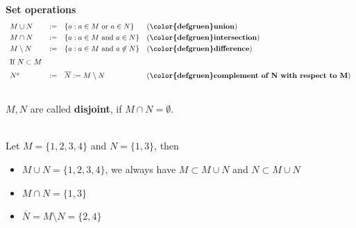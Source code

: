 \begin{frame} 
\textbf{\large Set operations} ~\\ 
\vspace{0.2cm}
$$\begin{array}{llll} 
M \cup N &:=& \lbrace a: a\in M \text{ or } a \in N\rbrace&\text{(\textbf{\color{defgruen}union})}\\[3pt]
M \cap N &:=& \lbrace a: a\in M \text{ and } a \in N\rbrace&\text{(\textbf{\color{defgruen}intersection})}\\[3pt]
M \setminus N &:=& \lbrace a : a\in M \text{ and } a \not\in N\rbrace&\text{(\textbf{\color{defgruen}difference})}\\[6pt]
\text{If}~N\subset M&&&\\[6pt]
 N^c  &:=&  \overline{N}:= M \setminus N&\text{(\textbf{\color{defgruen}complement of N with respect to M})}\\[3pt]
\end{array}$$ 
~\\\vspace{0.3cm}
$M, N$ are called \textbf{\color{defgruen}disjoint},  if $M \cap N = \emptyset$.
%
\vspace{0.5cm}
\begin{ex} \label{ex:set_operations}
	~\\
	\blank
	Let $M = \{1,2,3, 4\}$ and $N = \{1,3\}$, then\vspace{0.2cm}
	\begin{itemize}
		\blank
		\item[] $M \cup N = \{1,2,3, 4\}$, we always have $M \subset M\cup N$ and  $N \subset M\cup N$ \vspace{0.2cm}
		\item[] $M \cap N = \{1, 3\}$\vspace{0.2cm}
		\item[] $\overline{N} =M \setminus N = \{2, 4\}$
	\end{itemize}
\end{ex}
\vspace{0.2cm}

\end{frame}

